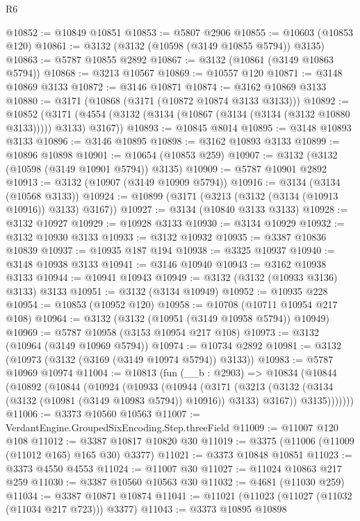 \begin{lexlean}{R6}
\begin{coremodule}
@10852 := @10849 @10851
@10853 := @5807 @2906
@10855 := @10603 (@10853 @120)
@10861 := @3132 (@3132 (@10598 (@3149 @10855 @5794)) @3135)
@10863 := @5787 @10855 @2892
@10867 := @3132 (@10861 (@3149 @10863 @5794))
@10868 := @3213 @10567
@10869 := @10557 @120
@10871 := @3148 @10869 @3133
@10872 := @3146 @10871
@10874 := @3162 @10869 @3133
@10880 := @3171 (@10868 (@3171 (@10872 @10874 @3133 @3133)))
@10892 := @10852
    (@3171 (@4554 (@3132 (@3134 (@10867 (@3134 (@3134 (@3132 @10880 @3133))))) @3133) @3167))
@10893 := @10845 @8014
@10895 := @3148 @10893 @3133
@10896 := @3146 @10895
@10898 := @3162 @10893 @3133
@10899 := @10896 @10898
@10901 := @10654 (@10853 @259)
@10907 := @3132 (@3132 (@10598 (@3149 @10901 @5794)) @3135)
@10909 := @5787 @10901 @2892
@10913 := @3132 (@10907 (@3149 @10909 @5794))
@10916 := @3134 (@3134 (@10568 @3133))
@10924 := @10899 (@3171 (@3213 (@3132 (@3134 (@10913 @10916)) @3133) @3167))
@10927 := @3134 (@10840 @3133 @3133)
@10928 := @3132 @10927
@10929 := @10928 @3133
@10930 := @3134 @10929
@10932 := @3132 @10930 @3133
@10933 := @3132 @10932
@10935 := @3387 @10836 @10839
@10937 := @10935 @187 @194
@10938 := @3325 @10937
@10940 := @3148 @10938 @3133
@10941 := @3146 @10940
@10943 := @3162 @10938 @3133
@10944 := @10941 @10943
@10949 := @3132 (@3132 (@10933 @3136) @3133) @3133
@10951 := @3132 (@3134 @10949)
@10952 := @10935 @228
@10954 := @10853 (@10952 @120)
@10958 := @10708 (@10711 @10954 @217 @108)
@10964 := @3132 (@3132 (@10951 (@3149 @10958 @5794)) @10949)
@10969 := @5787 @10958 (@3153 @10954 @217 @108)
@10973 := @3132 (@10964 (@3149 @10969 @5794))
@10974 := @10734 @2892
@10981 := @3132 (@10973 (@3132 (@3169 (@3149 @10974 @5794)) @3133))
@10983 := @5787 @10969 @10974
@11004 := @10813
    (fun (__b : @2903) =>
    @10834
      (@10844
        (@10892
          (@10844
            (@10924
              (@10933
                (@10944
                  (@3171
                    (@3213
                      (@3132 (@3134 (@3132 (@10981 (@3149 @10983 @5794)) @10916)) @3133)
                      @3167))
                  @3135)))))))
@11006 := @3373 @10560 @10563
@11007 := VerdantEngine.GroupedSixEncoding.Step.threeField
@11009 := @11007 @120 @108
@11012 := @3387 @10817 @10820 @30
@11019 := @3375 (@11006 (@11009 (@11012 @165) @165 @30) @3377)
@11021 := @3373 @10848 @10851
@11023 := @3373 @4550 @4553
@11024 := @11007 @30
@11027 := @11024 @10863 @217 @259
@11030 := @3387 @10560 @10563 @30
@11032 := @4681 (@11030 @259)
@11034 := @3387 @10871 @10874
@11041 := @11021 (@11023 (@11027 (@11032 (@11034 @217 @723))) @3377)
@11043 := @3373 @10895 @10898

\end{coremodule}
\end{lexlean}
